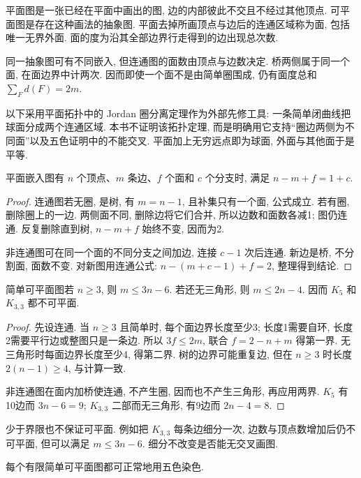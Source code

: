\label{ch:planar}
\begin{definition}
平面图是一张已经在平面中画出的图, 边的内部彼此不交且不经过其他顶点. 可平面图是存在这种画法的抽象图. 平面去掉所画顶点与边后的连通区域称为面, 包括唯一无界外面. 面的度为沿其全部边界行走得到的边出现总次数.
\end{definition}
同一抽象图可有不同嵌入, 但连通图的面数由顶点与边数决定. 桥两侧属于同一个面, 在面边界中计两次. 因而即使一个面不是由简单圈围成, 仍有面度总和 $\sum_F d(F)=2m$.

以下采用平面拓扑中的 Jordan 圈分离定理作为外部先修工具: 一条简单闭曲线把球面分成两个连通区域. 本书不证明该拓扑定理, 而是明确用它支持“圈边两侧为不同面”以及五色证明中的不能交叉. 平面加上无穷远点即为球面, 外面与其他面于是平等.
\begin{theorem}[Euler 公式]\label{thm:eulerformula}
平面嵌入图有 $n$ 个顶点、$m$ 条边、$f$ 个面和 $c$ 个分支时, 满足 $n-m+f=1+c$.
\end{theorem}
\begin{proof}
连通图若无圈, 是树, 有 $m=n-1$, 且补集只有一个面, 公式成立. 若有圈, 删除圈上的一边. 两侧面不同, 删除边将它们合并, 所以边数和面数各减1; 图仍连通. 反复删除直到树, $n-m+f$ 始终不变, 因而为2.

非连通图可在同一个面的不同分支之间加边, 连接 $c-1$ 次后连通. 新边是桥, 不分割面, 面数不变. 对新图用连通公式: $n-(m+c-1)+f=2$, 整理得到结论.
\end{proof}
\begin{corollary}\label{cor:planaredges}
简单可平面图若 $n\ge3$, 则 $m\le3n-6$. 若还无三角形, 则 $m\le2n-4$. 因而 $K_5$ 和 $K_{3,3}$ 都不可平面.
\end{corollary}
\begin{proof}
先设连通. 当 $n\ge3$ 且简单时, 每个面边界长度至少3; 长度1需要自环, 长度2需要平行边或整图只是一条边. 所以 $3f\le2m$, 联合 $f=2-n+m$ 得第一界. 无三角形时每面边界长度至少4, 得第二界. 树的边界可能重复边, 但在 $n\ge3$ 时长度 $2(n-1)\ge4$, 与计算一致.

非连通图在面内加桥使连通, 不产生圈, 因而也不产生三角形, 再应用两界. $K_5$ 有10边而 $3n-6=9$; $K_{3,3}$ 二部而无三角形, 有9边而 $2n-4=8$.
\end{proof}
少于界限也不保证可平面. 例如把 $K_{3,3}$ 每条边细分一次, 边数与顶点数增加后仍不可平面, 但可以满足 $m\le3n-6$. 细分不改变是否能无交叉画图.
\begin{theorem}[五色定理]\label{thm:fivecolor}
每个有限简单可平面图都可正常地用五色染色.
\end{theorem}
